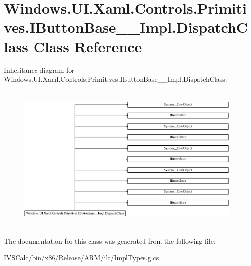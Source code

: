 \hypertarget{class_windows_1_1_u_i_1_1_xaml_1_1_controls_1_1_primitives_1_1_i_button_base_____impl_1_1_dispatch_class}{}\section{Windows.\+U\+I.\+Xaml.\+Controls.\+Primitives.\+I\+Button\+Base\+\_\+\+\_\+\+Impl.\+Dispatch\+Class Class Reference}
\label{class_windows_1_1_u_i_1_1_xaml_1_1_controls_1_1_primitives_1_1_i_button_base_____impl_1_1_dispatch_class}
Inheritance diagram for Windows.\+U\+I.\+Xaml.\+Controls.\+Primitives.\+I\+Button\+Base\+\_\+\+\_\+\+Impl.\+Dispatch\+Class\+:\begin{figure}[H]
\begin{center}
\leavevmode
\includegraphics[height=7.403846cm]{class_windows_1_1_u_i_1_1_xaml_1_1_controls_1_1_primitives_1_1_i_button_base_____impl_1_1_dispatch_class}
\end{center}
\end{figure}


The documentation for this class was generated from the following file\+:\begin{DoxyCompactItemize}
\item 
I\+V\+S\+Calc/bin/x86/\+Release/\+A\+R\+M/ilc/Impl\+Types.\+g.\+cs\end{DoxyCompactItemize}

